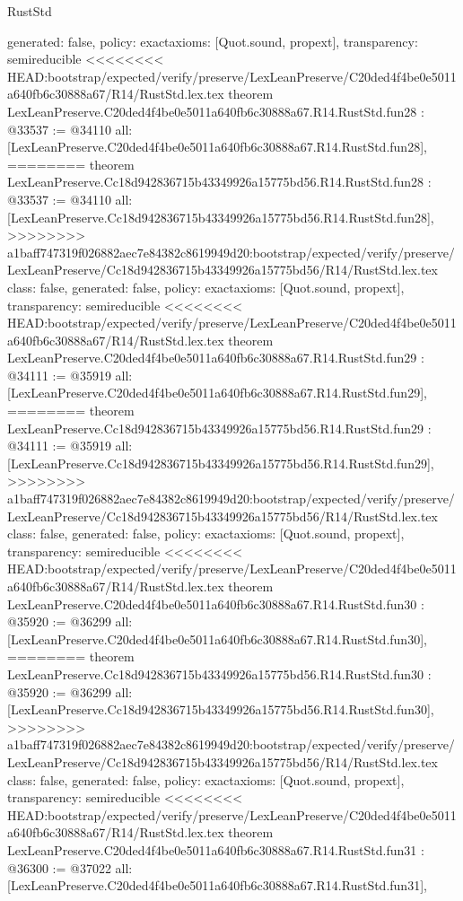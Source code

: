 \begin{lexlean}{RustStd}
\begin{coremodule}
{\begin{coremodule}
{{{{{{{{{{{{{{{{{{{{{{{{{{{{{{{  generated: false,
  policy: exact{axioms: [Quot.sound, propext]},
  transparency: semireducible
}
<<<<<<<< HEAD:bootstrap/expected/verify/preserve/LexLeanPreserve/C20ded4f4be0e5011a640fb6c30888a67/R14/RustStd.lex.tex
theorem LexLeanPreserve.C20ded4f4be0e5011a640fb6c30888a67.R14.RustStd.fun28 : @33537 := @34110 {
  all: [LexLeanPreserve.C20ded4f4be0e5011a640fb6c30888a67.R14.RustStd.fun28],
========
theorem LexLeanPreserve.Cc18d942836715b43349926a15775bd56.R14.RustStd.fun28 : @33537 := @34110 {
  all: [LexLeanPreserve.Cc18d942836715b43349926a15775bd56.R14.RustStd.fun28],
>>>>>>>> a1baff747319f026882aec7e84382c8619949d20:bootstrap/expected/verify/preserve/LexLeanPreserve/Cc18d942836715b43349926a15775bd56/R14/RustStd.lex.tex
  class: false,
  generated: false,
  policy: exact{axioms: [Quot.sound, propext]},
  transparency: semireducible
}
<<<<<<<< HEAD:bootstrap/expected/verify/preserve/LexLeanPreserve/C20ded4f4be0e5011a640fb6c30888a67/R14/RustStd.lex.tex
theorem LexLeanPreserve.C20ded4f4be0e5011a640fb6c30888a67.R14.RustStd.fun29 : @34111 := @35919 {
  all: [LexLeanPreserve.C20ded4f4be0e5011a640fb6c30888a67.R14.RustStd.fun29],
========
theorem LexLeanPreserve.Cc18d942836715b43349926a15775bd56.R14.RustStd.fun29 : @34111 := @35919 {
  all: [LexLeanPreserve.Cc18d942836715b43349926a15775bd56.R14.RustStd.fun29],
>>>>>>>> a1baff747319f026882aec7e84382c8619949d20:bootstrap/expected/verify/preserve/LexLeanPreserve/Cc18d942836715b43349926a15775bd56/R14/RustStd.lex.tex
  class: false,
  generated: false,
  policy: exact{axioms: [Quot.sound, propext]},
  transparency: semireducible
}
<<<<<<<< HEAD:bootstrap/expected/verify/preserve/LexLeanPreserve/C20ded4f4be0e5011a640fb6c30888a67/R14/RustStd.lex.tex
theorem LexLeanPreserve.C20ded4f4be0e5011a640fb6c30888a67.R14.RustStd.fun30 : @35920 := @36299 {
  all: [LexLeanPreserve.C20ded4f4be0e5011a640fb6c30888a67.R14.RustStd.fun30],
========
theorem LexLeanPreserve.Cc18d942836715b43349926a15775bd56.R14.RustStd.fun30 : @35920 := @36299 {
  all: [LexLeanPreserve.Cc18d942836715b43349926a15775bd56.R14.RustStd.fun30],
>>>>>>>> a1baff747319f026882aec7e84382c8619949d20:bootstrap/expected/verify/preserve/LexLeanPreserve/Cc18d942836715b43349926a15775bd56/R14/RustStd.lex.tex
  class: false,
  generated: false,
  policy: exact{axioms: [Quot.sound, propext]},
  transparency: semireducible
}
<<<<<<<< HEAD:bootstrap/expected/verify/preserve/LexLeanPreserve/C20ded4f4be0e5011a640fb6c30888a67/R14/RustStd.lex.tex
theorem LexLeanPreserve.C20ded4f4be0e5011a640fb6c30888a67.R14.RustStd.fun31 : @36300 := @37022 {
  all: [LexLeanPreserve.C20ded4f4be0e5011a640fb6c30888a67.R14.RustStd.fun31],
}}}}}}}}}}}}}}}}}}}}}}}}}}}}}}}}}}
\end{coremodule}}
\end{coremodule}
\end{lexlean}
